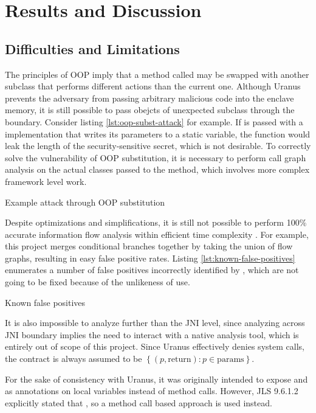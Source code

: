 \section{Results and Discussion}
\subsection{Difficulties and Limitations}
The principles of OOP imply that a method called may be swapped with another subclass
that performs different actions than the current one.
Although Uranus prevents the adversary
from passing arbitrary malicious code into the enclave memory,
it is still possible to pass obejcts of unexpected subclass
through the  boundary.
Consider listing \ref{lst:oop-subst-attack} for example.
If  is passed with a  implementation
that writes its parameters to a static variable,
the function would leak the length of the security-sensitive secret,
which is not desirable.
To correctly solve the vulnerability of OOP substitution,
it is necessary to perform call graph analysis on the actual classes passed to the method,
which involves more complex framework level work.

{Example attack through OOP substitution}

Despite optimizations and simplifications,
it is still not possible to perform 100\% accurate information flow analysis
within efficient time complexity \cite{SmithGeoffrey2007PoSI}.
For example, this project merges conditional branches together
by taking the union of flow graphs,
resulting in easy false positive rates.
Listing \ref{lst:known-false-positives} enumerates a number of false positives
incorrectly identified by \pname{},
which are not going to be fixed because of the unlikeness of use.

{Known false positives}

It is also impossible to analyze further than the JNI level,
since analyzing across JNI boundary implies
the need to interact with a native analysis tool,
which is entirely out of scope of this project.
Since Uranus effectively denies system calls,
the contract is always assumed to be
$\left\{ (p, \text{return}) : p \in \text{params} \right\}$.

For the sake of consistency with Uranus,
it was originally intended to expose  and 
as annotations on local variables instead of method calls.
However, JLS 9.6.1.2 explicitly stated that
 \cite{jls},
so a method call based approach is used instead.

